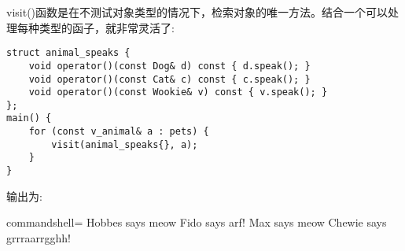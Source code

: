 visit()函数是在不测试对象类型的情况下，检索对象的唯一方法。结合一个可以处理每种类型的函子，就非常灵活了:

\begin{lstlisting}[style=styleCXX]
struct animal_speaks {
	void operator()(const Dog& d) const { d.speak(); }
	void operator()(const Cat& c) const { c.speak(); }
	void operator()(const Wookie& v) const { v.speak(); }
};
main() {
	for (const v_animal& a : pets) {
		visit(animal_speaks{}, a);
	}
}
\end{lstlisting}

输出为:

\begin{tcblisting}{commandshell={}}
Hobbes says meow
Fido says arf!
Max says meow
Chewie says grrraarrgghh!
\end{tcblisting}


